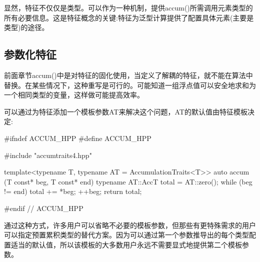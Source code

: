显然，特征不仅仅是类型。可以作为一种机制，提供accum()所需调用元素类型的所有必要信息。这是特征概念的关键:特征为泛型计算提供了配置具体元素(主要是类型)的途径。

\subsection{参数化特征}

前面章节accum()中是对特征的固化使用，当定义了解耦的特征，就不能在算法中替换。在某些情况下，这种重写是可行的。可能知道一组浮点值可以安全地求和为一个相同类型的变量，这样做可能提高效率。

可以通过为特征添加一个模板参数AT来解决这个问题，AT的默认值由特征模板决定:

\begin{cpp}
#ifndef ACCUM_HPP
#define ACCUM_HPP

#include "accumtraits4.hpp"

template<typename T, typename AT = AccumulationTraits<T>>
auto accum (T const* beg, T const* end)
{
	typename AT::AccT total = AT::zero();
	while (beg != end) {
		total += *beg;
		++beg;
	}
	return total;
}

#endif // ACCUM_HPP
\end{cpp}

通过这种方式，许多用户可以省略不必要的模板参数，但那些有更特殊需求的用户可以指定预置累积类型的替代方案。因为可以通过第一个参数推导出的每个类型配置适当的默认值，所以该模板的大多数用户永远不需要显式地提供第二个模板参数。









